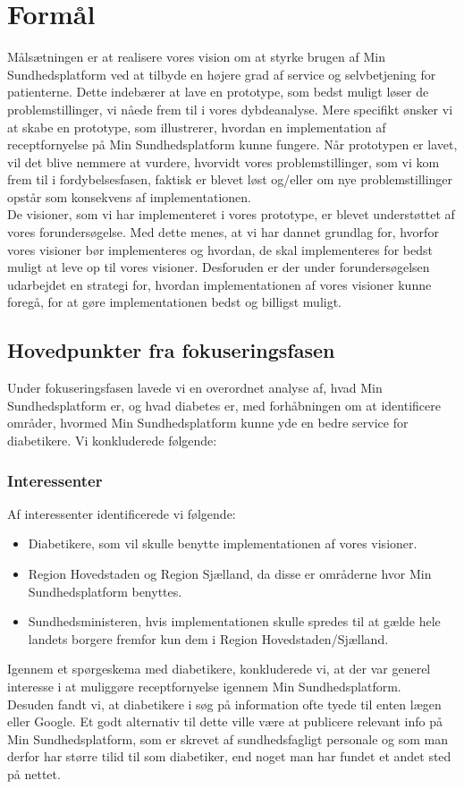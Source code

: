 \section{Formål}
Målsætningen er at realisere vores vision om at styrke brugen af Min Sundhedsplatform ved at tilbyde en højere grad af service og selvbetjening for patienterne. Dette indebærer at lave en prototype, som bedst muligt løser de problemstillinger, vi nåede frem til i vores dybdeanalyse. Mere specifikt ønsker vi at skabe en prototype, som illustrerer, hvordan en implementation af receptfornyelse på Min Sundhedsplatform kunne fungere. Når prototypen er lavet, vil det blive nemmere at vurdere, hvorvidt vores problemstillinger, som vi kom frem til i fordybelsesfasen, faktisk er blevet løst og/eller om nye problemstillinger opstår som konsekvens af implementationen.\\
De visioner, som vi har implementeret i vores prototype, er blevet understøttet af vores forundersøgelse. Med dette menes, at vi har dannet grundlag for, hvorfor vores visioner bør implementeres og hvordan, de skal implementeres for bedst muligt at leve op til vores visioner. Desforuden er der under forundersøgelsen udarbejdet en strategi for, hvordan implementationen af vores visioner kunne foregå, for at gøre implementationen bedst og billigst muligt. 
\subsection{Hovedpunkter fra fokuseringsfasen}
Under fokuseringsfasen lavede vi en overordnet analyse af, hvad Min Sundhedsplatform er, og hvad diabetes er, med forhåbningen om at identificere områder, hvormed Min Sundhedsplatform kunne yde en bedre service for diabetikere. Vi konkluderede følgende:
\subsubsection{Interessenter}
Af interessenter identificerede vi følgende:
\begin{itemize}
\item Diabetikere, som vil skulle benytte implementationen af vores visioner.
\item Region Hovedstaden og Region Sjælland, da disse er områderne hvor Min Sundhedsplatform benyttes.
\item Sundhedsministeren, hvis implementationen skulle spredes til at gælde hele landets borgere fremfor kun dem i Region Hovedstaden/Sjælland.
\end{itemize}
Igennem et spørgeskema med diabetikere, konkluderede vi, at der var generel interesse i at muliggøre receptfornyelse igennem Min Sundhedsplatform.\\
Desuden fandt vi, at diabetikere i søg på information ofte tyede til enten lægen eller Google. Et godt alternativ til dette ville være at publicere relevant info på Min Sundhedsplatform, som er skrevet af sundhedsfagligt personale og som man derfor har større tilid til som diabetiker, end noget man har fundet et andet sted på nettet. 
